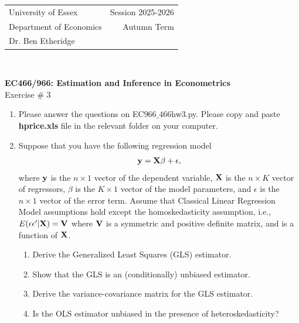 \documentclass[12pt,a4paper]{article}
\begin{document}
\begin{tabular}{l r}
University of Essex  \hspace{35ex}& Session 2025-2026 \\
Department of Economics \hspace{35ex} & Autumn Term\\
Dr. Ben Etheridge \hspace{35ex} &
\end{tabular}
\\
\begin{center}
\large{\textbf{EC466/966: Estimation and Inference in Econometrics}\\
Exercise \# 3}
\end{center}

\begin{enumerate}
\item{Please answer the questions on EC$966\_466$hw3.py. Please copy and paste {\bf hprice.xls} file in the relevant folder on your computer.}
\item{Suppose that you have the following regression model}
\begin{align*}
{\bf y}={\bf X}\beta +\epsilon,
\end{align*}
where ${\bf y}$ is the $n \times 1$ vector of the dependent variable, ${\bf X}$ is the $n \times K$ vector of regressors, $\beta$ is the $K \times 1$ vector of the model parameters, and $\epsilon$ is the $n \times 1$ vector of the error term. Assume that Classical Linear Regression Model assumptions hold except the homoskedasticity assumption, i.e., $E(\epsilon \epsilon'|{\bf X})={\bf V}$ where ${\bf V}$ is a symmetric and positive definite matrix, and is a function of ${\bf X}$. 
\begin{enumerate}
\item{Derive the Generalized Least Squares (GLS) estimator.}
\item{Show that the GLS is an (conditionally) unbiased estimator.}
\item{Derive the variance-covariance matrix for the GLS estimator.}
\item{Is the OLS estimator unbiased in the presence of heteroskedasticity?}
\end{enumerate}
\vspace*{0.5cm}
\end{enumerate}
\end{document}
